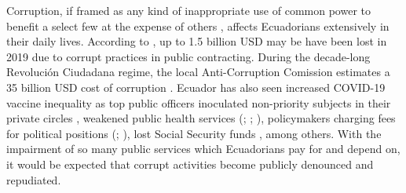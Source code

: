 \documentclass[floatsintext,man]{apa7}\usepackage[]{graphicx}\usepackage[]{color}
\begin{document}
\begin{figure}[htbp]
\end{figure}
Corruption, if framed as any kind of inappropriate use of common power to benefit a select few at the expense of others \parencite{Warren.2004}, affects Ecuadorians extensively in their daily lives. According to \textcite{AlarconSalvador.2020}, up to 1.5 billion USD may be have been lost in 2019 due to corrupt practices in public contracting. During the decade-long Revolución Ciudadana regime, the local Anti-Corruption Comission estimates a 35 billion USD cost of corruption \parencite{RoaChejin.2020}. Ecuador has also seen increased COVID-19 vaccine inequality as top public officers inoculated non-priority subjects in their private circles \parencite{Taj.2021}, weakened public health services (\cite{Celi.2020}; \cite{Comercio.2021}; \cite{RoaChejin.2020}), policymakers charging fees for political positions (\cite{Espinosa.2021}; \cite{Gonzalez.2021}), lost Social Security funds \parencite{Pesantes.9152020}, among others. With the impairment of so many public services which Ecuadorians pay for and depend on, it would be expected that corrupt activities become publicly denounced and repudiated.
\end{document}

